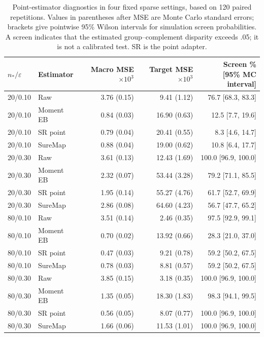 \begin{table}[t]
\centering\small
\caption{Point-estimator diagnostics in four fixed sparse settings, based on 120 paired repetitions. Values in parentheses after MSE are Monte Carlo standard errors; brackets give pointwise 95\% Wilson intervals for simulation screen probabilities. A screen indicates that the estimated group--complement disparity exceeds .05; it is not a calibrated test. SR is the point adapter.}\label{tab:estimators}
\begin{tabular}{llrrr}
\toprule
$n_*/\varepsilon$ & Estimator & \shortstack{Macro MSE\\$\times10^3$} & \shortstack{Target MSE\\$\times10^3$} & \shortstack{Screen \%\\{[95\% MC interval]}} \\
\midrule
20/0.10 & Raw & 3.76 (0.15) & 9.41 (1.12) & 76.7 [68.3, 83.3] \\
20/0.10 & Moment EB & 0.84 (0.03) & 16.90 (0.63) & 12.5 [7.7, 19.6] \\
20/0.10 & SR point & 0.79 (0.04) & 20.41 (0.55) & 8.3 [4.6, 14.7] \\
20/0.10 & SureMap & 0.88 (0.04) & 19.00 (0.62) & 10.8 [6.4, 17.7] \\
20/0.30 & Raw & 3.61 (0.13) & 12.43 (1.69) & 100.0 [96.9, 100.0] \\
20/0.30 & Moment EB & 2.32 (0.07) & 53.44 (3.28) & 79.2 [71.1, 85.5] \\
20/0.30 & SR point & 1.95 (0.14) & 55.27 (4.76) & 61.7 [52.7, 69.9] \\
20/0.30 & SureMap & 2.86 (0.08) & 64.60 (4.23) & 56.7 [47.7, 65.2] \\
80/0.10 & Raw & 3.51 (0.14) & 2.46 (0.35) & 97.5 [92.9, 99.1] \\
80/0.10 & Moment EB & 0.70 (0.02) & 13.92 (0.66) & 28.3 [21.0, 37.0] \\
80/0.10 & SR point & 0.47 (0.03) & 9.21 (0.78) & 59.2 [50.2, 67.5] \\
80/0.10 & SureMap & 0.78 (0.03) & 8.81 (0.57) & 59.2 [50.2, 67.5] \\
80/0.30 & Raw & 3.85 (0.15) & 3.18 (0.35) & 100.0 [96.9, 100.0] \\
80/0.30 & Moment EB & 1.35 (0.05) & 18.30 (1.83) & 98.3 [94.1, 99.5] \\
80/0.30 & SR point & 0.56 (0.05) & 8.07 (0.77) & 100.0 [96.9, 100.0] \\
80/0.30 & SureMap & 1.66 (0.06) & 11.53 (1.01) & 100.0 [96.9, 100.0] \\
\bottomrule
\end{tabular}
\end{table}
